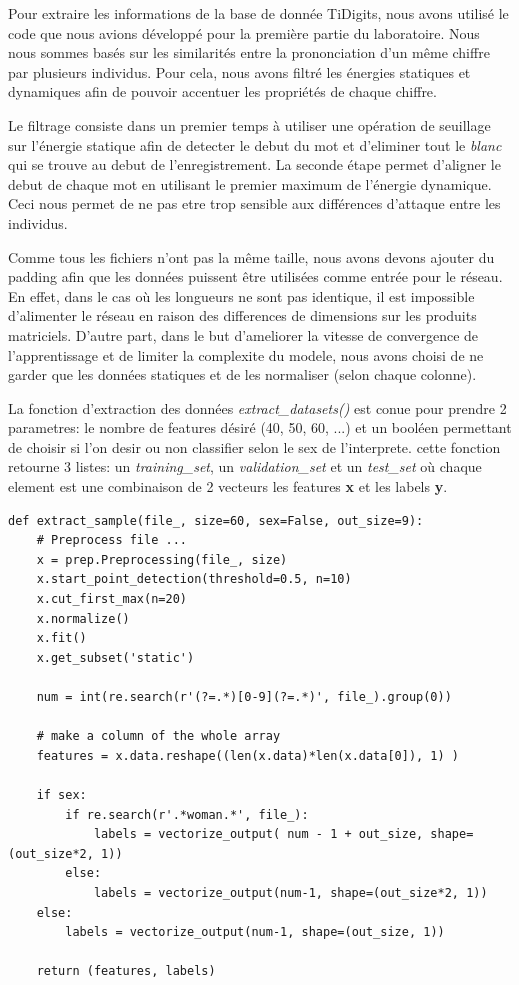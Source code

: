 \documentclass[11pt]{article}
\begin{document}
Pour extraire les informations de la base de donn\'ee TiDigits, nous avons
utilis\'e le code que nous avions d\'evelopp\'e pour la premi\`ere partie du laboratoire.
Nous nous sommes bas\'es sur les similarit\'es entre la prononciation d'un
m\^eme chiffre par plusieurs individus. Pour cela, nous avons filtr\'e
les \'energies statiques et dynamiques afin de pouvoir accentuer les
propri\'et\'es de chaque chiffre.


Le filtrage consiste dans un premier temps \`a utiliser une op\'eration de
seuillage sur l'\'energie statique afin de detecter le debut du mot et
d'eliminer tout le {\em blanc} qui se trouve au debut de l'enregistrement.
La seconde \'etape permet d'aligner le debut de chaque mot en utilisant le
premier maximum de l'\'energie dynamique.
Ceci nous permet de ne pas etre trop sensible aux diff\'erences d'attaque
entre les individus.

Comme tous les fichiers n'ont pas la m\^eme taille, nous avons devons ajouter
du padding afin que les donn\'ees puissent \^etre utilis\'ees comme
entr\'ee pour le r\'eseau. En effet, dans le cas o\`u les longueurs ne sont pas
identique, il est impossible d'alimenter le r\'eseau en raison des differences
de dimensions sur les produits matriciels.
D'autre part, dans le but d'ameliorer la vitesse de convergence de
l'apprentissage et de limiter la complexite du modele, nous avons choisi de ne
garder que les donn\'ees statiques et de les normaliser (selon chaque colonne).

La fonction d'extraction des donn\'ees {\em extract\_datasets()}
est con\cc ue pour prendre 2 parametres: le nombre de features d\'esir\'e
(40, 50, 60, ...) et un bool\'een permettant de choisir si l'on desir ou non
classifier selon le sex de l'interprete. cette fonction retourne 3 listes:
un {\em training\_set}, un {\em validation\_set} et un {\em test\_set} o\`u
chaque element est une combinaison de 2 vecteurs les features {\bf x} et les
labels {\bf y}.

\begin{lstlisting}
def extract_sample(file_, size=60, sex=False, out_size=9):
    # Preprocess file ...
    x = prep.Preprocessing(file_, size)
    x.start_point_detection(threshold=0.5, n=10)
    x.cut_first_max(n=20)
    x.normalize()
    x.fit()
    x.get_subset('static')

    num = int(re.search(r'(?=.*)[0-9](?=.*)', file_).group(0))

    # make a column of the whole array
    features = x.data.reshape((len(x.data)*len(x.data[0]), 1) )

    if sex:
        if re.search(r'.*woman.*', file_):
            labels = vectorize_output( num - 1 + out_size, shape=(out_size*2, 1))
        else:
            labels = vectorize_output(num-1, shape=(out_size*2, 1))
    else:
        labels = vectorize_output(num-1, shape=(out_size, 1))

    return (features, labels)

\end{lstlisting}
\end{document}
